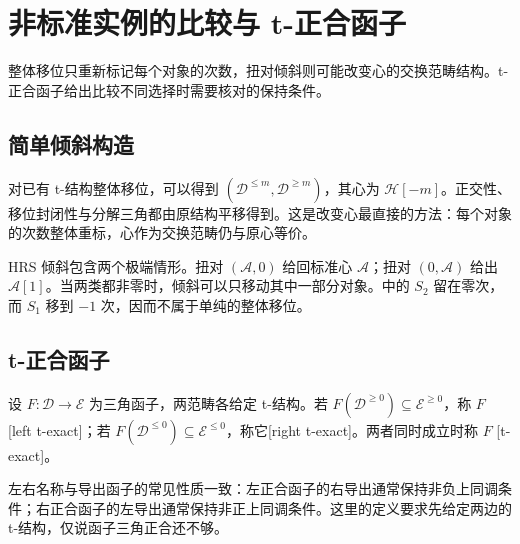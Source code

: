
\section{非标准实例的比较与 t-正合函子}
\label{b4:sec:1906}

整体移位只重新标记每个对象的次数，扭对倾斜则可能改变心的交换范畴结构。t-正合函子给出比较不同选择时需要核对的保持条件。


%
%
%

\subsection{简单倾斜构造}
\label{b4:subsec:1906:01}

对已有 t-结构整体移位，可以得到 \((\mathcal D^{\le m},\mathcal D^{\ge m})\)，其心为 \(\mathcal H[-m]\)。正交性、移位封闭性与分解三角都由原结构平移得到。这是改变心最直接的方法：每个对象的次数整体重标，心作为交换范畴仍与原心等价。

\ProseParagraphBreak
HRS 倾斜包含两个极端情形。扭对 \((\mathcal A,0)\) 给回标准心 \(\mathcal A\)；扭对 \((0,\mathcal A)\) 给出 \(\mathcal A[1]\)。当两类都非零时，倾斜可以只移动其中一部分对象。中的 \(S_2\) 留在零次，而 \(S_1\) 移到 \(-1\) 次，因而不属于单纯的整体移位。

\subsection{t-正合函子}
\label{b4:subsec:1906:02}

\begin{definition}\label{b4:def:t-exact-functor}
	设 \(F:\mathcal D\to\mathcal E\) 为三角函子，两范畴各给定 t-结构。若 \(F(\mathcal D^{\ge0})\subseteq\mathcal E^{\ge0}\)，称 \(F\) [left t-exact]；若 \(F(\mathcal D^{\le0})\subseteq\mathcal E^{\le0}\)，称它[right t-exact]。两者同时成立时称 \(F\) [t-exact]。
\end{definition}

左右名称与导出函子的常见性质一致：左正合函子的右导出通常保持非负上同调条件；右正合函子的左导出通常保持非正上同调条件。这里的定义要求先给定两边的 t-结构，仅说函子三角正合还不够。

